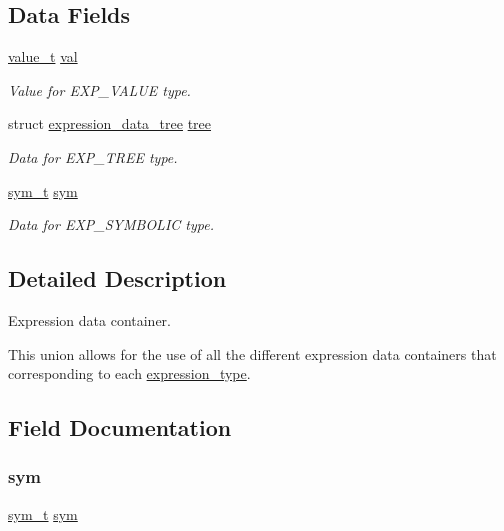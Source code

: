 \subsection*{Data Fields}
\begin{DoxyCompactItemize}
\item 
\hyperlink{types_8h_ae4d4f561b975159d5852cb2c30bf20ef}{value\+\_\+t} \hyperlink{unionexpression__data_a9999269c3069b319f17690c708789d42}{val}
\begin{DoxyCompactList}\small\item\em Value for E\+X\+P\+\_\+\+V\+A\+L\+UE type. \end{DoxyCompactList}\item 
struct \hyperlink{structexpression__data__tree}{expression\+\_\+data\+\_\+tree} \hyperlink{unionexpression__data_a786f772ef255a1ea6fbb97622b000bc1}{tree}
\begin{DoxyCompactList}\small\item\em Data for E\+X\+P\+\_\+\+T\+R\+EE type. \end{DoxyCompactList}\item 
\hyperlink{symbolic_8h_a32ce0f63fa539078e25332dae6b7c77c}{sym\+\_\+t} \hyperlink{unionexpression__data_a09af8ed794d8611cb68c5b68283c260f}{sym}
\begin{DoxyCompactList}\small\item\em Data for E\+X\+P\+\_\+\+S\+Y\+M\+B\+O\+L\+IC type. \end{DoxyCompactList}\end{DoxyCompactItemize}


\subsection{Detailed Description}
Expression data container. 

This union allows for the use of all the different expression data containers that corresponding to each \hyperlink{expression_8h_a5a6601c4e142145f0e87051cb21ece0f}{expression\+\_\+type}. 

\subsection{Field Documentation}
\mbox{\label{unionexpression__data_a09af8ed794d8611cb68c5b68283c260f}} 
\subsubsection{\texorpdfstring{sym}{sym}}
{\footnotesize\ttfamily \hyperlink{symbolic_8h_a32ce0f63fa539078e25332dae6b7c77c}{sym\+\_\+t} \hyperlink{structsym}{sym}}



